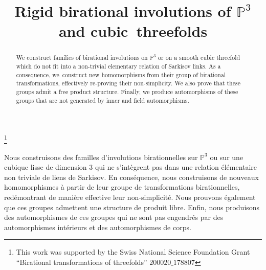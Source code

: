 \documentclass[JEP,XML,SOM,Unicode,published]{cedram}
\theoremstyle{plain}
\theoremstyle{definition}
\begin{document}
\frontmatter

\title{Rigid birational involutions of $\mathbb{P}^3$ and cubic~threefolds}

\author[\initial{S.} \lastname{Zikas}]{ }
\address{Universität Basel, Departement Mathematik und Informatik\\ Spiegelgasse 1, CH--4051 Basel, Switzerland}

\thanks{This work was supported by the Swiss National Science Foundation Grant ``Birational transformations of threefolds'' $200020\_178807$}

\begin{abstract}
We construct families of birational involutions on $\mathbb{P}^3$ or on a smooth cubic threefold which do not fit into a non-trivial elementary relation of Sarkisov links. As a consequence, we~construct new homomorphisms from their group of birational transformations, effectively re-proving their non-simplicity. We also prove that these groups admit a free product structure. Finally, we produce automorphisms of these groups that are not generated by inner and field automorphisms.
\end{abstract}





\begin{altabstract}
Nous construisons des familles d'involutions birationnelles sur $\mathbb{P}^3$ ou sur une cubique lisse de dimension $3$ qui ne s'intègrent pas dans une relation élémentaire non triviale de liens de Sarkisov. En conséquence, nous construisons de nouveaux homomorphismes à partir de leur groupe de transformations birationnelles, redémontrant de manière effective leur non-simplicité. Nous prouvons également que ces groupes admettent une structure de produit libre. Enfin, nous produisons des automorphismes de ces groupes qui ne sont pas engendrés par des automorphismes intérieurs et des automorphismes de corps.
\end{altabstract}
\end{document}
